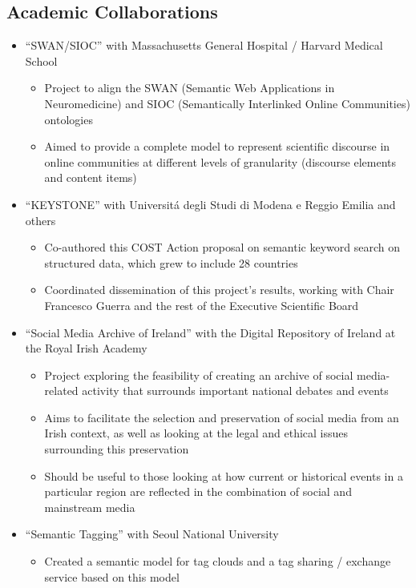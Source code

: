 \documentclass[10pt,a4paper]{res} %
\begin{document}
\begin{resume}
\subsection*{Academic Collaborations}

\begin{itemize} \itemsep -2pt
\item ``SWAN/SIOC'' with Massachusetts General Hospital / Harvard Medical School
\begin{itemize} \itemsep -2pt
\item Project to align the SWAN (Semantic Web Applications in Neuromedicine) and SIOC (Semantically Interlinked Online Communities) ontologies
\item Aimed to provide a complete model to represent scientific discourse in online communities at different levels of granularity (discourse elements and content items)
\end{itemize}
\item ``KEYSTONE'' with Universit\'{a} degli Studi di Modena e Reggio Emilia and others
\begin{itemize} \itemsep -2pt
\item Co-authored this COST Action proposal on semantic keyword search on structured data, which grew to include 28 countries
\item Coordinated dissemination of this project's results, working with Chair Francesco Guerra and the rest of the Executive Scientific Board
\end{itemize}
\item ``Social Media Archive of Ireland'' with the Digital Repository of Ireland at the Royal Irish Academy
\begin{itemize} \itemsep -2pt
\item Project exploring the feasibility of creating an archive of social media-related activity that surrounds important national debates and events
\item Aims to facilitate the selection and preservation of social media from an Irish context, as well as looking at the legal and ethical issues surrounding this preservation
\item Should be useful to those looking at how current or historical events in a particular region are reflected in the combination of social and mainstream media
\end{itemize}
\item ``Semantic Tagging'' with Seoul National University
\begin{itemize} \itemsep -2pt
\item Created a semantic model for tag clouds and a tag sharing / exchange service based on this model

\end{itemize}
\end{itemize}
\end{resume}
\end{document}
